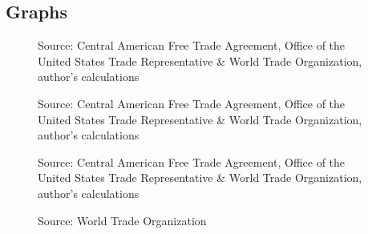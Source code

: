 \begin{landscape}
\chapter{Graphs}
\label{sec:Graphs}

\begin{figure}[H]
\centering
\resizebox{10cm}{!}{}
\caption{\label{fig:Graph1}}
Source: Central American Free Trade Agreement, Office of the United States Trade Representative \&
World Trade Organization, author's calculations
\end{figure}

\begin{figure}[H]
\centering
\resizebox{!}{\vsize}{}
\caption{\label{fig:Graph2}}
Source: Central American Free Trade Agreement, Office of the United States Trade Representative \&
World Trade Organization, author's calculations
\end{figure}

\begin{figure}[H]
\centering
\resizebox{!}{\vsize}{}
\caption{\label{fig:Graph3}}
Source: Central American Free Trade Agreement, Office of the United States Trade Representative \&
World Trade Organization, author's calculations
\end{figure}

\begin{figure}[H]
\centering
\resizebox{!}{\vsize}{}
\caption{\label{fig:Graph4}}

Source: World Trade Organization
\end{figure}


\end{landscape}
